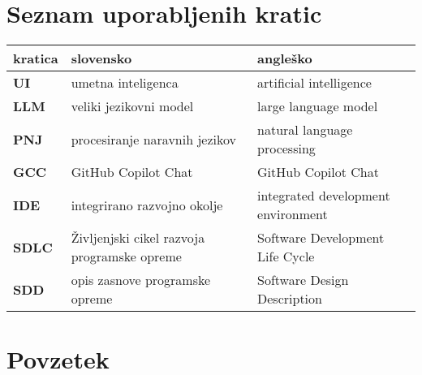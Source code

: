 \documentclass[a4paper,12pt,openright]{book}
\newcommand{\clearemptydoublepage}{\newpage{\pagestyle{empty}\cleardoublepage}}
\begin{document}
\vfill



\vspace{2cm}

\clearemptydoublepage
\pagestyle{empty}

\def\thepage{}%
\tableofcontents{}
\mainmatter 


\clearemptydoublepage


\chapter*{Seznam uporabljenih kratic}

\noindent\begin{tabular}{p{}|p{}|p{}}    %
  {\bf kratica} & {\bf slovensko}                              & {\bf angleško} \\ \hline
  {\bf UI}      & umetna inteligenca               & artificial intelligence \\
    {\bf LLM}      & veliki jezikovni model            & large language model \\
  {\bf PNJ} & procesiranje naravnih jezikov & natural language processing \\
  {\bf GCC}   & GitHub Copilot Chat              & GitHub Copilot Chat \\
    {\bf IDE}   & integrirano razvojno okolje              & integrated development environment \\
      {\bf SDLC}   & Življenjski cikel razvoja programske opreme              & Software Development Life Cycle \\
            {\bf SDD}   & opis zasnove programske opreme           & Software Design Description \\
\end{tabular}


\clearemptydoublepage

{}
\chapter*{Povzetek}
\end{document}
